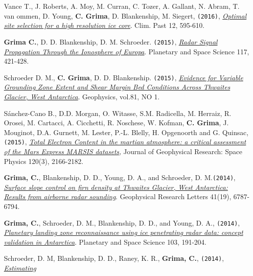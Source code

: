 \begin{etaremune}
\item
  Vance T., J. Roberts, A. Moy, M. Curran, C. Tozer, A. Gallant, N.
  Abram, T. van ommen, D. Young, \textbf{C. Grima}, D. Blankenship, M.
  Siegert, \texttt{(2016)},
  \href{http://www.clim-past.net/12/595/2016/cp-12-595-2016.pdf}{\emph{Optimal
  site selection for a high resolution ice core}}. Clim. Past 12,
  595-610.
\item
  \textbf{Grima C.}, D. D. Blankenship, D. M. Schroeder. \texttt{(2015)},
  \emph{\href{http://www.sciencedirect.com/science/article/pii/S0032063315002470}{Radar
  Signal Propagation Through the Ionosphere of Europa}}. Planetary and
  Space Science 117, 421-428.
\item
  Schroeder D. M., \textbf{C. Grima}, D. D. Blankenship. \texttt{(2015)},
  \emph{\href{http://library.seg.org/doi/abs/10.1190/geo2015-0122.1}{Evidence
  for Variable Grounding Zone Extent and Shear Margin Bed Conditions
  Across Thwaites Glacier, West Antarctica}}. Geophysics, vol.81, NO 1.
\item
  Sánchez-Cano B., D.D. Morgan, O. Witasse, S.M. Radicella, M. Herraiz,
  R. Orosei, M. Cartacci, A. Cicchetti, R. Noschese, W. Kofman,
  \textbf{C. Grima}, J. Mouginot, D.A. Gurnett, M. Lester, P.-L. Blelly,
  H. Opgenoorth and G. Quinsac, \texttt{(2015)},
  \emph{\href{http://onlinelibrary.wiley.com/doi/10.1002/2014JA020630/abstract}{Total
  Electron Content in the martian atmosphere: a critical assessment of
  the Mars Express MARSIS datasets},} Journal of Geophysical Research:
  Space Physics 120(3), 2166-2182.
\item
  \textbf{Grima, C.}, Blankenship, D. D., Young, D. A., and Schroeder,
  D. M.\texttt{(2014)},
  \href{http://onlinelibrary.wiley.com/enhanced/doi/10.1002/2014GL061635/}{\emph{Surface
  slope control on firn density at Thwaites Glacier, West Antarctica:
  Results from airborne radar sounding}}. Geophysical Research Letters
  41(19), 6787-6794.
\item
  \textbf{Grima, C.}, Schroeder, D. M., Blankenship, D. D., and Young,
  D. A., \texttt{(2014)},
  \href{http://www.sciencedirect.com/science/article/pii/S0032063314002244}{\emph{Planetary
  landing zone reconnaissance using ice penetrating radar data: concept
  validation in Antarctica}}. Planetary and Space Science 103, 191-204.
\item
  Schroeder, D. M, Blankenship, D. D., Raney, K. R., \textbf{Grima, C.},
  \texttt{(2014)},
  \href{http://ieeexplore.ieee.org/xpl/login.jsp?tp=\&arnumber=6901268\&url=http\%3A\%2F\%2Fieeexplore.ieee.org\%2Fstamp\%2Fstamp.jsp\%3Ftp\%3D\%26arnumber\%3D6901268}{\emph{Estimating
}}
\end{etaremune}
